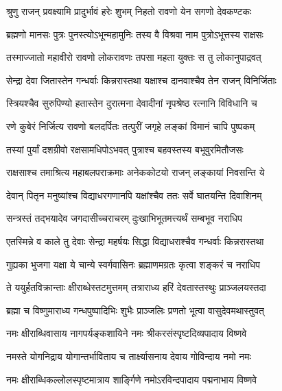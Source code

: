 \storymeta




\twolineshloka
{श्रुणु राजन् प्रवक्ष्यामि प्रादुर्भावं हरेः शुभम्}
{निहतो रावणो येन सगणो देवकण्टकः} %

\twolineshloka
{ब्रह्मणो मानसः पुत्रः पुनस्त्योऽभून्महामुनिः}
{तस्य वै विश्रवा नाम पुत्रोऽभूत्तस्य राक्षसः} %

\twolineshloka
{तस्माज्जातो महावीरो रावणो लोकरावणः}
{तपसा महता युक्तः स तु लोकानुपाद्रवत्} %

\twolineshloka
{सेन्द्रा देवा जितास्तेन गन्धर्वाः किन्नरास्तथा}
{यक्षाश्च दानवाश्चैव तेन राजन् विनिर्जिताः} %

\twolineshloka
{स्त्रियश्चैव सुरुपिण्यो हतास्तेन दुरात्मना}
{देवादीनां नृपश्रेष्ठ रत्नानि विविधानि च} %

\twolineshloka
{रणे कुबेरं निर्जित्य रावणो बलदर्पितः}
{तत्पुरीं जगृहे लङ्कां विमानं चापि पुष्पकम्} %

\twolineshloka
{तस्यां पुर्यां दशग्रीवो रक्षसामधिपोऽभवत्}
{पुत्राश्च बहवस्तस्य बभूवुरमितौजसः} %

\twolineshloka
{राक्षसाश्च तमाश्रित्य महाबलपराक्रमाः}
{अनेककोटयो राजन् लङ्कायां निवसन्ति ये} %

\twolineshloka
{देवान् पितृन मनुष्यांश्च विद्याधरगणानपि}
{यक्षांश्चैव ततः सर्वे घातयन्ति दिवाशिनम्} %

\twolineshloka
{सन्त्रस्तं तद्भयादेव जगदासीच्चराचरम्}
{दुःखाभिभूतमत्त्यर्थं सम्बभूव नराधिप} %

\twolineshloka
{एतस्मिन्ने व काले तु देवाः सेन्द्रा महर्षयः}
{सिद्धा विद्याधराश्चैव गन्धर्वाः किन्नरास्तथा} %

\twolineshloka
{गुह्यका भुजगा यक्षा ये चान्ये स्वर्गवासिनः}
{ब्रह्माणमग्रतः कृत्वा शङ्करं च नराधिप} %

\twolineshloka
{ते ययुर्हतविक्रान्ताः क्षीराब्धेस्तटमुत्तमम्}
{तत्राराध्य हरिं देवतास्तस्थुः प्राञ्जलयस्तदा} %

\twolineshloka
{ब्रह्मा च विष्णुमाराध्य गन्धपुष्पादिभिः शुभैः}
{प्राञ्जलिः प्रणतो भूत्वा वासुदेवमथास्तुवत्} %


\twolineshloka
{नमः क्षीराब्धिवासाय नागपर्यङ्कशायिने}
{नमः श्रीकरसंस्पृष्टदिव्यपादाय विष्णवे} %

\twolineshloka
{नमस्ते योगनिद्राय योगान्तर्भाविताय च}
{तार्क्ष्यासनाय देवाय गोविन्दाय नमो नमः} %

\twolineshloka
{नमः क्षीराब्धिकल्लोलस्पृष्टमात्राय शार्ङ्गिणे}
{नमोऽरविन्दपादाय पद्मनाभाय विष्णवे} %

